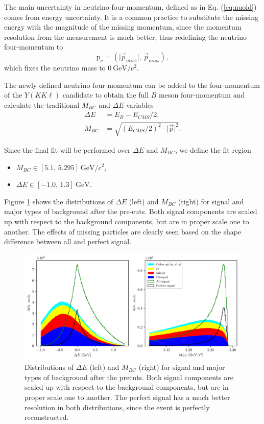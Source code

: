 \documentclass[headings=standardclasses,headings=big,oneside,a4paper,openany,12pt]{scrbook}
\newcommand {\e}[1]{\mathrm{~#1}}
\newcommand {\vars}{$\Delta E$ and $M_{BC}$}
\begin{document}
The main uncertainty in neutrino four-momentum, defined as in Eq. (\ref{eq:nuold}) comes from energy uncertainty. It is a common practice to substitute the missing energy with the magnitude of the missing momentum, since the momentum resolution from the measurement is much better, thus redefining the neutrino four-momentum to
\begin{equation}
\label{eq:nunew}
\mathrm{p}_\nu = \left(\vert \vec{p}_{miss} \vert,\,\vec{p}_{miss} \right),
\end{equation}
which fixes the neutrino mass to $0\e{GeV}/c^2$.

The newly defined neutrino four-momentum can be added to the four-momentum of the $Y(KK\ell)$ candidate to obtain the full $B$ meson four-momentum and calculate the traditional $M_{BC}$ and $\Delta E$ variables
\begin{align}
\label{eq:de}
\Delta E &= E_B - E_{CMS}/2,\\
M_{BC} &= \sqrt{\left(E_{CMS}/2\right)^2 - \vert \vec{p} \vert^2}.
\end{align}

Since the final fit will be performed over \vars, we define the fit region
\begin{itemize}
\item $M_{BC} \in [5.1,\,5.295]\e{GeV}/c^2$,
\item $\Delta E \in [-1.0,\,1.3]\e{GeV}$.
\end{itemize}

Figure \ref{fig:mbc_de_pre} shows the distributions of $\Delta E$ (left) and $M_{BC}$ (right) for signal and major types of background after the pre-cuts. Both signal components are scaled up with respect to the background components, but are in proper scale one to another. The effects of missing particles are clearly seen based on the shape difference between all and perfect signal.

\begin{figure}[H]
\centering
\captionsetup{width=0.8\linewidth}
\includegraphics[width=\linewidth]{fig/mbc_de_pre}
\caption{Distributions of $\Delta E$ (left) and $M_{BC}$ (right) for signal and major types of background after the precuts. Both signal components are scaled up with respect to the background components, but are in proper scale one to another. The perfect signal has a much better resolution in both distributions, since the event is perfectly reconstructed.}
\label{fig:mbc_de_pre}
\end{figure}
\end{document}
